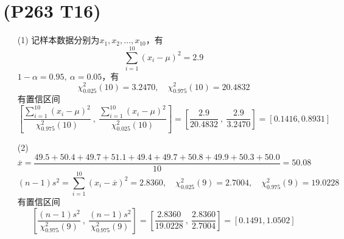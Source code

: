 \documentclass{article}
\begin{document}
\section{(P263 T16)}  %
\begin{enumerate}
    \item [(1)]记样本数据分别为$x_1, x_2, \ldots, x_{10}$，有
    \[
        \sum\limits_{i=1}^{10} {\left(x_i - \mu\right)}^2 = 2.9
    \]
    $1 - \alpha = 0.95,\ \alpha = 0.05$，有
    \[
        \chi_{0.025}^{2} (10) = 3.2470 , \quad
        \chi_{0.975}^{2} (10) = 20.4832
    \]
    有置信区间
    \[
        \left[
            \frac{\sum\limits_{i=1}^{10} {\left(x_i - \mu\right)}^2}{\chi_{0.975}^{2} (10)} 
            \ ,\ 
            \frac{\sum\limits_{i=1}^{10} {\left(x_i - \mu\right)}^2}{\chi_{0.025}^{2} (10)} 
        \right]
        = \left[\frac{2.9}{20.4832}\ ,\ \frac{2.9}{3.2470} \right]
        = [0.1416 , 0.8931]
    \]
    \item [(2)]
    \[
        \overline{x} 
        = \frac{49.5 + 50.4 + 49.7 + 51.1 + 49.4 + 49.7 + 50.8 + 49.9 + 50.3 + 50.0}{10}    
        = 50.08
    \]
    \[
        (n-1) s^2 = \sum\limits_{i=1}^{10} {(x_i - \overline{x})}^2 = 2.8360, \quad
        \chi_{0.025}^{2} (9) = 2.7004, \quad
        \chi_{0.975}^{2} (9) = 19.0228
    \] 
    有置信区间
    \[
        \left[
            \frac{(n-1) s^2}{\chi_{0.975}^{2} (9)}
            \ ,\ 
            \frac{(n-1) s^2}{\chi_{0.975}^{2} (9)}
        \right]
        = \left[\frac{2.8360}{19.0228}\ ,\ \frac{2.8360}{2.7004}\right]
        = [0.1491 , 1.0502]
    \]
\end{enumerate}
\end{document}
